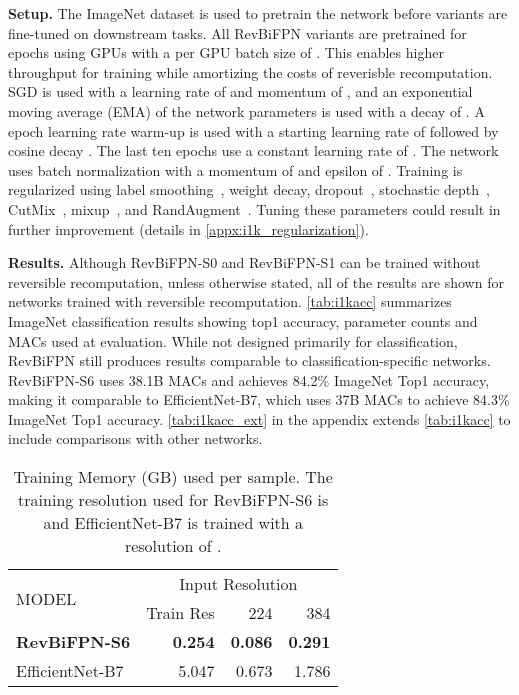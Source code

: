 \documentclass{article}
\begin{document}
\textbf{Setup.} The ImageNet dataset is used to pretrain the network before variants are fine-tuned on downstream tasks.
All RevBiFPN variants are pretrained for  epochs using  GPUs with a per GPU batch size of . This enables higher throughput for training while amortizing the costs of reverisble recomputation.
SGD is used with a learning rate of  and momentum of , and
an exponential moving average (EMA) of the network parameters is used with a decay of .
A  epoch learning rate warm-up is used with a starting learning rate of  followed by cosine decay \cite{loshchilov2017sgdr}.
The last ten epochs use a constant learning rate of .
The network uses batch normalization with a momentum of  and epsilon of .
Training is regularized using label smoothing~\cite{szegedy2016rethinking}, weight decay, dropout~\cite{srivastava2014dropout}, stochastic depth~\cite{huang2016deep}, CutMix~\cite{yun2019cutmix}, mixup~\cite{zhang2018mixup}, and RandAugment~\cite{cubuk2020randaugment}.
Tuning these parameters could result in further improvement (details in \cref{appx:i1k_regularization}).

\textbf{Results.}
Although RevBiFPN-S0 and RevBiFPN-S1 can be trained without reversible recomputation, unless otherwise stated, all of the results are shown for networks trained with reversible recomputation.
\cref{tab:i1kacc} summarizes ImageNet classification results showing top1 accuracy, parameter counts and MACs used at evaluation.
While not designed primarily for classification, RevBiFPN still produces results comparable to classification-specific networks.
RevBiFPN-S6 uses 38.1B MACs and achieves 84.2\% ImageNet Top1 accuracy, making it comparable to EfficientNet-B7, which uses 37B MACs to achieve 84.3\% ImageNet Top1 accuracy. \cref{tab:i1kacc_ext} in the appendix extends \cref{tab:i1kacc} to include comparisons with other networks.

\begin{table}
    \caption{
        Training Memory (GB) used  per sample.
        The training resolution used for RevBiFPN-S6 is  and EfficientNet-B7 is trained with a resolution of .
    }
    \vskip 10pt
    \centering
    \small
    \sc
    \begin{tabular}{lrrr}
        \toprule
        \multirow{2}{*}{MODEL} & \multicolumn{3}{c}{Input Resolution}                                 \\ \cmidrule{2-4}
                              & \multicolumn{1}{r}{Train Res}      & 224           & 384            \\ \midrule
        \textbf{RevBiFPN-S6}  & \multicolumn{1}{r}{\textbf{0.254}} & \textbf{0.086} & \textbf{0.291} \\
        EfficientNet-B7        & \multicolumn{1}{r}{5.047}         & 0.673         & 1.786         \\
        \bottomrule
    \end{tabular}
    \vskip -7pt
    \label{tab:mem}
\end{table}
\end{document}
